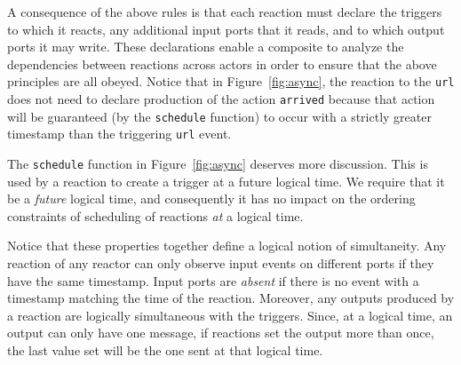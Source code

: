 \documentclass[sigconf]{acmart}
\begin{document}
A consequence of the above rules is that each reaction must declare the triggers to which
it reacts, any additional input ports that it reads, and to which output ports it may write.
These declarations enable a composite to analyze the dependencies between reactions across actors
in order to ensure that the above principles are all obeyed.
Notice that in Figure~\ref{fig:async}, the reaction to the \texttt{url} does not need to declare production
of the action \texttt{arrived} because that action will be guaranteed (by the \texttt{schedule} function) to
occur with a strictly greater timestamp than the triggering \texttt{url} event.

The \texttt{schedule} function in Figure~\ref{fig:async} deserves more discussion.
This is used by a reaction to create a trigger at a future logical time.
We require that it be a \emph{future} logical time, and consequently it has no impact on
the ordering constraints of scheduling of reactions \emph{at} a logical time.

Notice that these properties together define a logical notion of simultaneity.
Any reaction of any reactor can only observe input events on different ports if they have the same timestamp.
Input ports are \emph{absent} if there is no event with a timestamp matching the time of the reaction.
Moreover, any outputs produced by a reaction are logically simultaneous with the triggers.
Since, at a logical time, an output can only have one message, if reactions set the output more than once,
the last value set will be the one sent at that logical time.
\end{document}
